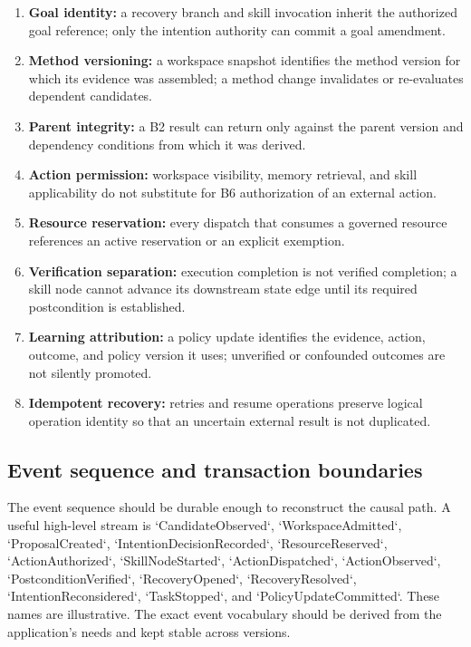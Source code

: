 \begin{enumerate}
  \item \textbf{Goal identity:} a recovery branch and skill invocation inherit the authorized goal reference; only the intention authority can commit a goal amendment.
  \item \textbf{Method versioning:} a workspace snapshot identifies the method version for which its evidence was assembled; a method change invalidates or re-evaluates dependent candidates.
  \item \textbf{Parent integrity:} a B2 result can return only against the parent version and dependency conditions from which it was derived.
  \item \textbf{Action permission:} workspace visibility, memory retrieval, and skill applicability do not substitute for B6 authorization of an external action.
  \item \textbf{Resource reservation:} every dispatch that consumes a governed resource references an active reservation or an explicit exemption.
  \item \textbf{Verification separation:} execution completion is not verified completion; a skill node cannot advance its downstream state edge until its required postcondition is established.
  \item \textbf{Learning attribution:} a policy update identifies the evidence, action, outcome, and policy version it uses; unverified or confounded outcomes are not silently promoted.
  \item \textbf{Idempotent recovery:} retries and resume operations preserve logical operation identity so that an uncertain external result is not duplicated.
\end{enumerate}

\subsection{Event sequence and transaction boundaries}
\label{subsec:ch18-event-sequence}

The event sequence should be durable enough to reconstruct the causal path. A useful high-level stream is `CandidateObserved`, `WorkspaceAdmitted`, `ProposalCreated`, `IntentionDecisionRecorded`, `ResourceReserved`, `ActionAuthorized`, `SkillNodeStarted`, `ActionDispatched`, `ActionObserved`, `PostconditionVerified`, `RecoveryOpened`, `RecoveryResolved`, `IntentionReconsidered`, `TaskStopped`, and `PolicyUpdateCommitted`. These names are illustrative. The exact event vocabulary should be derived from the application's needs and kept stable across versions.

